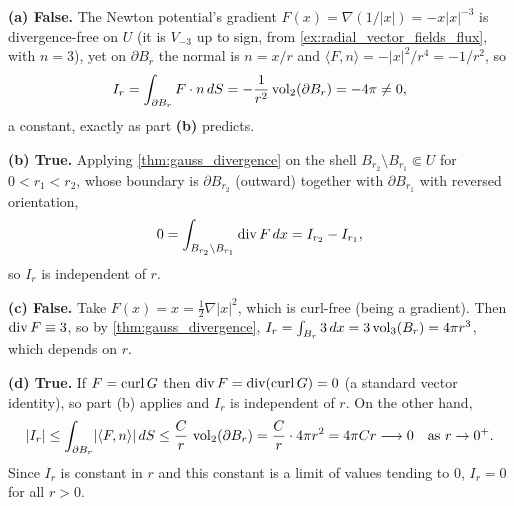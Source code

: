 \begin{exercisesolution}
\label{sol:flux_on_punctured_domain}
\textbf{(a) False.} The Newton potential's gradient $F(x) = \nabla(1/\lvert x\rvert) =
-x\lvert x\rvert^{-3}$ is divergence-free on $U$ (it is $V_{-3}$ up to sign, from
\cref{ex:radial_vector_fields_flux}, with $n=3$), yet on $\partial B_r$ the normal is $n = x/r$
and $\langle F,n\rangle = -\lvert x\rvert^2/r^4 = -1/r^2$, so
\[I_r = \int_{\partial B_r} F\cdot n\,dS = -\frac{1}{r^2}\operatorname{vol}_2(\partial B_r) = -4\pi \neq 0,\]
a constant, exactly as part \textbf{(b)} predicts.

\textbf{(b) True.} Applying \cref{thm:gauss_divergence} on the shell $B_{r_2}\setminus
B_{r_1} \Subset U$ for $0<r_1<r_2$, whose boundary is $\partial B_{r_2}$ (outward) together
with $\partial B_{r_1}$ with reversed orientation,
\[0 = \int_{B_{r_2}\setminus B_{r_1}} \operatorname{div} F\,dx = I_{r_2} - I_{r_1},\]
so $I_r$ is independent of $r$.

\textbf{(c) False.} Take $F(x) = x = \tfrac12\nabla\lvert x\rvert^2$, which is curl-free
(being a gradient). Then $\operatorname{div} F \equiv 3$, so by \cref{thm:gauss_divergence}, $I_r =
\int_{B_r} 3\,dx = 3\operatorname{vol}_3(B_r) = 4\pi r^3$, which depends on $r$.

\textbf{(d) True.} If $F = \operatorname{curl} G$ then $\operatorname{div} F = \operatorname{div}(\operatorname{curl} G) = 0$ (a standard vector
identity), so part (b) applies and $I_r$ is independent of $r$. On the other hand,
\[\lvert I_r\rvert \leq \int_{\partial B_r} \lvert\langle F,n\rangle\rvert\,dS \leq
  \frac{C}{r}\,\operatorname{vol}_2(\partial B_r) = \frac{C}{r}\cdot4\pi r^2 = 4\pi C r \longrightarrow 0
  \quad\text{as } r\to0^+.\]
Since $I_r$ is constant in $r$ and this constant is a limit of values tending to $0$, $I_r=0$
for all $r>0$.
\end{exercisesolution}


